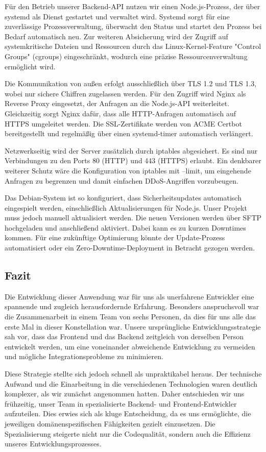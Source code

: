 \documentclass[a4paper,12pt]{article}
\begin{document}
Für den Betrieb unserer Backend-API nutzen wir einen Node.js-Prozess, der über systemd als Dienst gestartet und verwaltet wird. Systemd sorgt für eine zuverlässige Prozessverwaltung, überwacht den Status und startet den Prozess bei Bedarf automatisch neu. Zur weiteren Absicherung wird der Zugriff auf systemkritische Dateien und Ressourcen durch das Linux-Kernel-Feature "Control Groups" (cgroups) eingeschränkt, wodurch eine präzise Ressourcenverwaltung ermöglicht wird.

Die Kommunikation von außen erfolgt ausschließlich über TLS 1.2 und TLS 1.3, wobei nur sichere Chiffren zugelassen werden. Für den Zugriff wird Nginx als Reverse Proxy eingesetzt, der Anfragen an die Node.js-API weiterleitet. Gleichzeitig sorgt Nginx dafür, dass alle HTTP-Anfragen automatisch auf HTTPS umgeleitet werden. Die SSL-Zertifikate werden von ACME Certbot bereitgestellt und regelmäßig über einen systemd-timer automatisch verlängert.

Netzwerkseitig wird der Server zusätzlich durch iptables abgesichert. Es sind nur Verbindungen zu den Ports 80 (HTTP) und 443 (HTTPS) erlaubt. Ein denkbarer weiterer Schutz wäre die Konfiguration von iptables mit --limit, um eingehende Anfragen zu begrenzen und damit einfachen DDoS-Angriffen vorzubeugen.

Das Debian-System ist so konfiguriert, dass Sicherheitsupdates automatisch eingespielt werden, einschließlich Aktualisierungen für Node.js. Unser Projekt muss jedoch manuell aktualisiert werden. Die neuen Versionen werden über SFTP hochgeladen und anschließend aktiviert. Dabei kann es zu kurzen Downtimes kommen. Für eine zukünftige Optimierung könnte der Update-Prozess automatisiert oder ein Zero-Downtime-Deployment in Betracht gezogen werden.

\subsection{Fazit}
Die Entwicklung dieser Anwendung war für uns als unerfahrene Entwickler eine spannende und zugleich herausfordernde Erfahrung. Besonders anspruchsvoll war die Zusammenarbeit in einem Team von sechs Personen, da dies für uns alle das erste Mal in dieser Konstellation war. Unsere ursprüngliche Entwicklungsstrategie sah vor, dass das Frontend und das Backend zeitgleich von derselben Person entwickelt werden, um eine voneinander abweichende Entwicklung zu vermeiden und mögliche Integrationsprobleme zu minimieren.

Diese Strategie stellte sich jedoch schnell als unpraktikabel heraus. Der technische Aufwand und die Einarbeitung in die verschiedenen Technologien waren deutlich komplexer, als wir zunächst angenommen hatten. Daher entschieden wir uns frühzeitig, unser Team in spezialisierte Backend- und Frontend-Entwickler aufzuteilen. Dies erwies sich als kluge Entscheidung, da es uns ermöglichte, die jeweiligen domänenspezifischen Fähigkeiten gezielt einzusetzen. Die Spezialisierung steigerte nicht nur die Codequalität, sondern auch die Effizienz unseres Entwicklungsprozesses.
\end{document}
